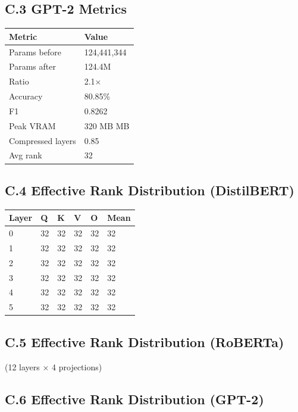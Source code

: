 \subsection{C.3 GPT-2 Metrics}

\begin{table}[H]
\centering
\small
\begin{tabular}{ll}
\toprule
\textbf{Metric} & \textbf{Value} \\
\midrule
Params before & 124,441,344 \\
Params after & 124.4M \\
Ratio & 2.1$\times$ \\
Accuracy & 80.85\% \\
F1 & 0.8262 \\
Peak VRAM & 320 MB MB \\
Compressed layers & 0.85 \\
Avg rank & 32 \\
\bottomrule
\end{tabular}
\end{table}

\subsection{C.4 Effective Rank Distribution (DistilBERT)}

\begin{table}[H]
\centering
\small
\begin{tabular}{llllll}
\toprule
\textbf{Layer} & \textbf{Q} & \textbf{K} & \textbf{V} & \textbf{O} & \textbf{Mean} \\
\midrule
0 & 32 & 32 & 32 & 32 & 32 \\
1 & 32 & 32 & 32 & 32 & 32 \\
2 & 32 & 32 & 32 & 32 & 32 \\
3 & 32 & 32 & 32 & 32 & 32 \\
4 & 32 & 32 & 32 & 32 & 32 \\
5 & 32 & 32 & 32 & 32 & 32 \\
\bottomrule
\end{tabular}
\end{table}

\subsection{C.5 Effective Rank Distribution (RoBERTa)}

(12 layers $\times$ 4 projections)

\subsection{C.6 Effective Rank Distribution (GPT-2)}

